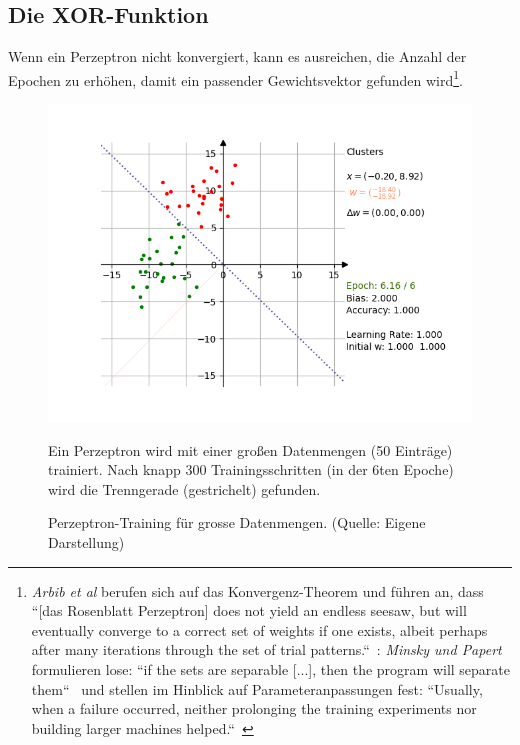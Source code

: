\subsection{Die XOR-Funktion}

Wenn ein Perzeptron nicht konvergiert, kann es ausreichen, die Anzahl der Epochen zu erhöhen, damit ein passender Gewichtsvektor gefunden wird\footnote{
    \textit{Arbib et al} berufen sich auf das Konvergenz-Theorem und führen an, dass ``[das Rosenblatt Perzeptron] does not yield an endless seesaw, but will eventually converge to a correct set of weights if one exists, albeit perhaps after many iterations through the set of trial patterns.``~\cite[20]{Arb03}: \textit{Minsky und Papert} formulieren lose: ``if the sets are separable [...], then the program will separate them``~\cite[165]{MP88} und stellen im Hinblick auf Parameteranpassungen fest: ``Usually, when a failure occurred, neither prolonging the training experiments nor building larger machines helped.``~\cite[xi]{MP88}
}.

\begin{figure}[h]
    \begin{center}
    \includegraphics{chapters/3. Kuenstliche Neuronen/images/blob_success}
    \caption{Perzeptron-Training für grosse Datenmengen. (Quelle: Eigene Darstellung)}
    \label{fig:rp-blobs}
    \end{center}
    \small Ein Perzeptron wird mit einer großen Datenmengen (50 Einträge) trainiert. Nach knapp 300 Trainingsschritten (in der 6ten Epoche) wird die Trenngerade (gestrichelt) gefunden.
\end{figure}

